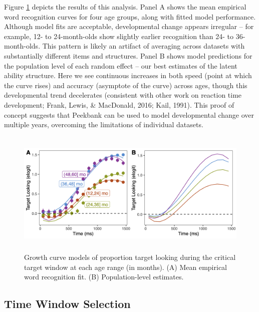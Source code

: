 \documentclass[10pt, letterpaper]{article}
\begin{document}
Figure \ref{fig:age_gca} depicts the results of this analysis. Panel A
shows the mean empirical word recognition curves for four age groups,
along with fitted model performance. Although model fits are acceptable,
developmental change appears irregular -- for example, 12- to
24-month-olds show slightly earlier recognition than 24- to
36-month-olds. This pattern is likely an artifact of averaging across
datasets with substantially different items and structures. Panel B
shows model predictions for the population level of each random effect
-- our best estimates of the latent ability structure. Here we see
continuous increases in both speed (point at which the curve rises) and
accuracy (asymptote of the curve) across ages, though this developmental
trend decelerates (consistent with other work on reaction time
development; Frank, Lewis, \& MacDonald, 2016; Kail, 1991). This proof
of concept suggests that Peekbank can be used to model developmental
change over multiple years, overcoming the limitations of individual
datasets.

\begin{figure} 
\includegraphics[width=14cm,height=6cm]{../figures/age_gca.png}
\caption{Growth curve models of proportion target looking during the critical target window at each age range (in months). (A) Mean empirical word recognition fit. (B) Population-level estimates.}
\label{fig:age_gca}
\end{figure}

\hypertarget{time-window-selection}{%
\subsection{Time Window Selection}\label{time-window-selection}}
\end{document}
